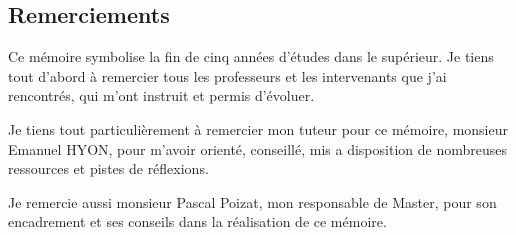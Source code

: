 \begin{center}
\subsection*{Remerciements}
\end{center}

\hskip7mm

\begin{spacing}{1.3}
Ce mémoire symbolise la fin de cinq années d'études dans le supérieur. Je tiens tout d'abord à remercier tous les professeurs et les intervenants que j'ai rencontrés, qui m'ont instruit et permis d'évoluer.

\vspace{5mm}

Je tiens tout particulièrement à remercier mon tuteur pour ce mémoire, monsieur Emanuel HYON, pour m'avoir orienté, conseillé, mis a disposition de nombreuses ressources et pistes de réflexions.

\vspace{5mm}

Je remercie aussi monsieur Pascal Poizat, mon responsable de Master, pour son encadrement et ses conseils dans la réalisation de ce mémoire.

\vspace{5mm}


\end{spacing}